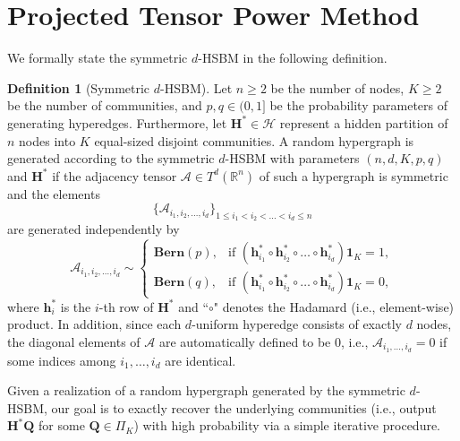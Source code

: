 \documentclass{article}
\theoremstyle{plain}
\theoremstyle{definition}
\newtheorem{definition}[theorem]{Definition}
\theoremstyle{remark}
\newcommand{\Br}{\mathbb{R}}
\newcommand{\BH}{\bm{H}}
\newcommand{\BQ}{\bm{Q}}
\newcommand{\HCal}{\mathcal{H}}
\newcommand{\ACal}{\mathcal{A}}
\def\bh{\bm{h}}
\begin{document}
\section{Projected Tensor Power Method} \label{sec: PTPM}
We formally state the symmetric $d$-HSBM in the following definition.
\begin{definition}[Symmetric $d$-HSBM] \label{def: dHSBM}
	Let $n \ge 2$ be the number of nodes, $K \ge 2$ be the number of communities, and $p,q\in (0,1]$ be the probability parameters of generating hyperedges. Furthermore, let $\BH^* \in \HCal$ represent a hidden partition of $n$ nodes into $K$ equal-sized disjoint communities. A random hypergraph is generated according to the symmetric $d$-HSBM with parameters $(n,d,K,p,q)$ and $\BH^*$ if the adjacency tensor $\ACal \in T^d(\Br^n)$ of such a hypergraph is symmetric and the elements 
 \begin{equation*}
     \{ 	\ACal_{i_1,i_2,\dots,i_d}\}_{1\leq i_1 <i_2<\dots<i_d \leq n}
 \end{equation*}
 are generated independently by
{\small 	\begin{equation}\label{eq: defdhsbm}
			\ACal_{i_1,i_2,\dots,i_d} \sim \begin{cases}\mathbf{Bern}(p),&\text{if } \left(\bh^*_{i_1}\circ \bh^*_{i_2}\circ \dots \circ \bh^*_{i_d}\right)\bm{1}_K =1, \\ \mathbf{Bern}(q),&\text{if }  \left(\bh^*_{i_1}\circ \bh^*_{i_2}\circ \dots \circ \bh^*_{i_d}\right) \bm{1}_K =0,\end{cases}
	\end{equation}}where $\bh_i^*$ is the $i$-th row of $\bm{H}^*$ and ``$\circ$" denotes the Hadamard (i.e., element-wise) product. In addition, since each $d$-uniform hyperedge consists of exactly $d$ nodes, the diagonal elements of $\ACal$ are automatically defined to be 0, i.e., $\ACal_{i_1,\dots,i_d} = 0$ if some indices among $i_1,\dots,i_d$ are identical.
\end{definition}
Given a realization of a random hypergraph generated by the symmetric $d$-HSBM, our goal is to exactly recover the underlying communities (i.e., output $\BH^* \BQ$ for some $\BQ \in \Pi_K$) with high probability via a simple iterative procedure.
\end{document}
